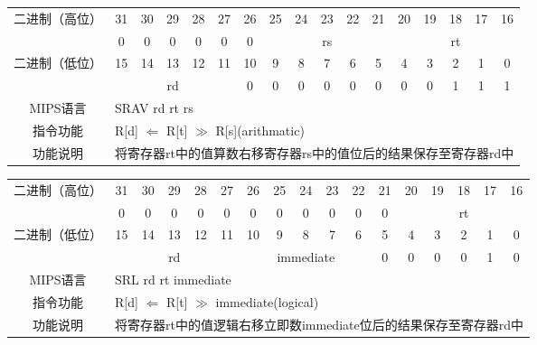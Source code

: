 \begin{table}
\begin{tabular}{|c|c|c|c|c|c|c|c|c|c|c|c|c|c|c|c|c|}
\hline
\multirow{2}{*}{二进制（高位）} &
31&30&29&28&27&26&25&24&23&22&21&20&19&18&17&16\\
\cline{2-17}
&
0&0&0&0&0&
0&
\multicolumn{5}{c|}{rs}&
\multicolumn{5}{c|}{rt}\\
\hline
\multirow{2}{*}{二进制（低位）} &
15&14&13&12&11&10&9&8&7&6&5&4&3&2&1&0\\
\cline{2-17}
&
\multicolumn{5}{c|}{rd} &
0&0&0&0&0&
0&0&0&1&1&
1\\
\hline
MIPS语言&
\multicolumn{16}{l|}{SRAV rd rt rs}\\
\hline
指令功能&
\multicolumn{16}{l|}{R[d] $\Leftarrow$ R[t] $\gg$ R[s](arithmatic)}\\
\hline
功能说明&
\multicolumn{16}{l|}{将寄存器rt中的值算数右移寄存器rs中的值位后的结果保存至寄存器rd中}\\
\hline
\end{tabular}
\end{table}

\begin{table}
\begin{tabular}{|c|c|c|c|c|c|c|c|c|c|c|c|c|c|c|c|c|}
\hline
\multirow{2}{*}{二进制（高位）} &
31&30&29&28&27&26&25&24&23&22&21&20&19&18&17&16\\
\cline{2-17}
&
0&0&0&0&0&
0&0&0&0&0&
0&
\multicolumn{5}{c|}{rt}\\
\hline
\multirow{2}{*}{二进制（低位）} &
15&14&13&12&11&10&9&8&7&6&5&4&3&2&1&0\\
\cline{2-17}
&
\multicolumn{5}{c|}{rd} &
\multicolumn{5}{c|}{immediate} &
0&0&0&0&1&
0\\
\hline
MIPS语言&
\multicolumn{16}{l|}{SRL rd rt immediate}\\
\hline
指令功能&
\multicolumn{16}{l|}{R[d] $\Leftarrow$ R[t] $\gg$ immediate(logical)}\\
\hline
功能说明&
\multicolumn{16}{l|}{将寄存器rt中的值逻辑右移立即数immediate位后的结果保存至寄存器rd中}\\
\hline
\end{tabular}
\end{table}

\clearpage


